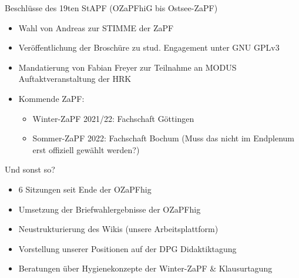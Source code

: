 \documentclass[compress, aspectratio=169]{beamer}
\begin{document}
\begin{frame}{Beschlüsse des 19ten StAPF (OZaPFhiG bis Ostsee-ZaPF)}
  \begin{itemize}
      \item Wahl von Andreas zur STIMME der ZaPF
      \item Veröffentlichung der Broschüre zu stud. Engagement unter GNU GPLv3
      \item Mandatierung von Fabian Freyer zur Teilnahme an MODUS Auftaktveranstaltung der HRK
      \item Kommende ZaPF:
        \begin{itemize}
          \item Winter-ZaPF 2021/22: Fachschaft Göttingen
          \item Sommer-ZaPF 2022: Fachschaft Bochum (Muss das nicht im Endplenum erst offiziell gewählt werden?)
        \end{itemize}
  \end{itemize}
\end{frame}


\begin{frame}{Und sonst so?}
  \begin{itemize}
    \item 6 Sitzungen seit Ende der OZaPFhig
    \item Umsetzung der Briefwahlergebnisse der OZaPFhig
    \item Neustrukturierung des Wikis (unsere Arbeitsplattform)
    \item Vorstellung unserer Positionen auf der DPG Didaktiktagung
    \item Beratungen über Hygienekonzepte der Winter-ZaPF \& Klausurtagung
  \end{itemize}
\end{frame}
\end{document}
